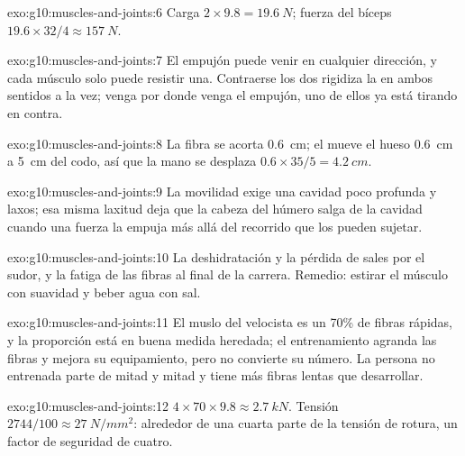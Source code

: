 \begin{solution}{exo:g10:muscles-and-joints:6}
Carga $2 \times 9.8 = \qty{19.6}{N}$; fuerza del bíceps $19.6 \times 32/4
\approx \qty{157}{N}$.
\end{solution}

\begin{solution}{exo:g10:muscles-and-joints:7}
El empujón puede venir en cualquier dirección, y cada músculo solo
puede resistir una. Contraerse los dos rigidiza la  en
ambos sentidos a la vez; venga por donde venga el empujón, uno de ellos
ya está tirando en contra.
\end{solution}

\begin{solution}{exo:g10:muscles-and-joints:8}
La fibra se acorta \qty{0.6}{cm}; el  mueve el hueso
\qty{0.6}{cm} a \qty{5}{cm} del codo, así que la mano se desplaza
$0.6 \times 35/5 = \qty{4.2}{cm}$.
\end{solution}

\begin{solution}{exo:g10:muscles-and-joints:9}
La movilidad exige una cavidad poco profunda y  laxos; esa
misma laxitud deja que la cabeza del húmero salga de la cavidad cuando
una fuerza la empuja más allá del recorrido que los  pueden
sujetar.
\end{solution}

\begin{solution}{exo:g10:muscles-and-joints:10}
La deshidratación y la pérdida de sales por el sudor, y la fatiga de
las fibras al final de la carrera. Remedio: estirar el músculo con
suavidad y beber agua con sal.
\end{solution}

\begin{solution}{exo:g10:muscles-and-joints:11}
El muslo del velocista es un 70\% de fibras rápidas, y la proporción
está en buena medida heredada; el entrenamiento agranda las fibras y
mejora su equipamiento, pero no convierte su número. La persona no
entrenada parte de mitad y mitad y tiene más fibras lentas que
desarrollar.
\end{solution}

\begin{solution}{exo:g10:muscles-and-joints:12}
$4 \times 70 \times 9.8 \approx \qty{2.7}{kN}$. Tensión $2744/100
\approx \qty{27}{N/mm^2}$: alrededor de una cuarta parte de la tensión
de rotura, un factor de seguridad de cuatro.
\end{solution}

